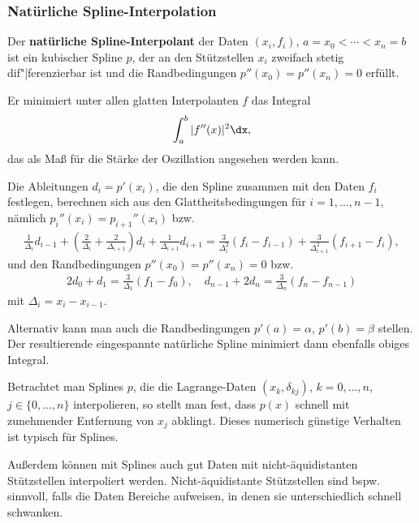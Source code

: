 \subsubsection{%
    Natürliche Spline-Interpolation%
}

Der \textbf{natürliche Spline-Interpolant} der Daten $(x_i, f_i)$,
$a = x_0 < \dotsb < x_n = b$ ist ein kubischer Spline $p$, der an den
Stützstellen $x_i$ zweifach stetig dif"|ferenzierbar ist und die
Randbedingungen $p''(x_0) = p''(x_n) = 0$ erfüllt.

Er minimiert unter allen glatten Interpolanten $f$ das Integral
\begin{align*}
    \int_a^b |f''(x)|^2 \dx,
\end{align*}
das als Maß für die Stärke der Oszillation angesehen werden kann.

\linie

Die Ableitungen $d_i = p'(x_i)$, die den Spline zusammen mit den Daten $f_i$
festlegen, berechnen sich aus den Glattheitsbedingungen für
$i = 1, \dotsc, n - 1$, nämlich $p_i''(x_i) = p_{i+1}''(x_i)$ bzw.
\begin{align*}
    \frac{1}{\Delta_i} d_{i-1} +
    \left(\frac{2}{\Delta_i} + \frac{2}{\Delta_{i+1}}\right) d_i +
    \frac{1}{\Delta_{i+1}} d_{i+1} =
    \frac{3}{\Delta_i^2} (f_i - f_{i-1}) +
    \frac{3}{\Delta_{i+1}^2} (f_{i+1} - f_i),
\end{align*}
und den Randbedingungen $p''(x_0) = p''(x_n) = 0$ bzw.
\begin{align*}
    2d_0 + d_1 =
    \frac{3}{\Delta_1} (f_1 - f_0), \quad
    d_{n-1} + 2d_n =
    \frac{3}{\Delta_n} (f_n - f_{n-1})
\end{align*}
mit $\Delta_i = x_i - x_{i-1}$.

Alternativ kann man auch die Randbedingungen $p'(a) = \alpha$,
$p'(b) = \beta$ stellen.
Der resultierende eingespannte natürliche Spline minimiert dann ebenfalls
obiges Integral.

\linie

Betrachtet man Splines $p$, die die Lagrange-Daten $(x_k, \delta_{kj})$,
$k = 0, \dotsc, n$, $j \in \{0, \dotsc, n\}$ interpolieren, so stellt man fest,
dass $p(x)$ schnell mit zunehmender Entfernung von $x_j$ abklingt.
Dieses numerisch günstige Verhalten ist typisch für Splines.

Außerdem können mit Splines auch gut Daten mit nicht-äquidistanten
Stützstellen interpoliert werden.
Nicht-äquidistante Stützstellen sind bspw. sinnvoll, falls die Daten Bereiche
aufweisen, in denen sie unterschiedlich schnell schwanken.

